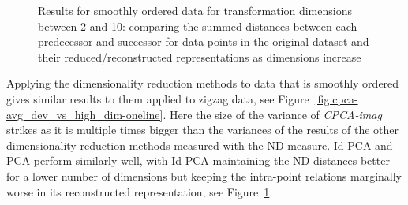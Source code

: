 \documentclass[pdftex,12pt,a4paper]{report}
\begin{document}
\begin{figure}[htb!]
    \caption{Results for smoothly ordered data for transformation dimensions between 2 and 10: comparing the summed distances between each predecessor and successor for data points in the original dataset and their reduced/reconstructed representations as dimensions increase}\label{fig:cpca-avg_dev_vs_high_dim-cut-oneline}
\end{figure}

Applying the dimensionality reduction methods to data that is smoothly ordered gives similar results to them applied to zigzag data, see Figure~\ref{fig:cpca-avg_dev_vs_high_dim-oneline}.
Here the size of the variance of \textit{CPCA-imag} strikes as it is multiple times bigger than the variances of the results of the other dimensionality reduction methods measured with the ND measure.
Id PCA and PCA perform similarly well, with Id PCA maintaining the ND distances better for a lower number of dimensions but keeping the intra-point relations marginally worse in its reconstructed representation, see Figure~\ref{fig:cpca-avg_dev_vs_high_dim-cut-oneline}.
\end{document}
